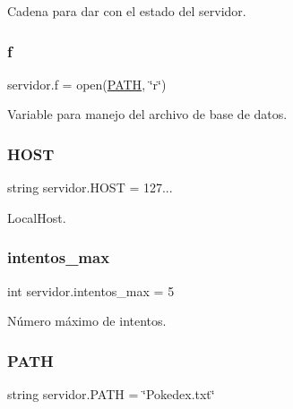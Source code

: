 Cadena para dar con el estado del servidor. 

\mbox{\label{namespaceservidor_a3b9b4590841faa9a4f552f71664e1c90}} 
\subsubsection{\texorpdfstring{f}{f}}
{\footnotesize\ttfamily servidor.\+f = open(\hyperlink{namespaceservidor_a841929f3d10a7b72399f0925da460cd9}{P\+A\+TH}, \char`\"{}r\char`\"{})}



Variable para manejo del archivo de base de datos. 

\mbox{\label{namespaceservidor_ab5793eb47d5467cdb26a6193b7196ecf}} 
\subsubsection{\texorpdfstring{H\+O\+ST}{HOST}}
{\footnotesize\ttfamily string servidor.\+H\+O\+ST = \textquotesingle{}127...\textquotesingle{}}



Local\+Host. 

\mbox{\label{namespaceservidor_a32acd4b3f7d9a4ca9489be7adaa1e209}} 
\subsubsection{\texorpdfstring{intentos\+\_\+max}{intentos\_max}}
{\footnotesize\ttfamily int servidor.\+intentos\+\_\+max = 5}



Número máximo de intentos. 

\mbox{\label{namespaceservidor_a841929f3d10a7b72399f0925da460cd9}} 
\subsubsection{\texorpdfstring{P\+A\+TH}{PATH}}
{\footnotesize\ttfamily string servidor.\+P\+A\+TH = \char`\"{}Pokedex.\+txt\char`\"{}}



